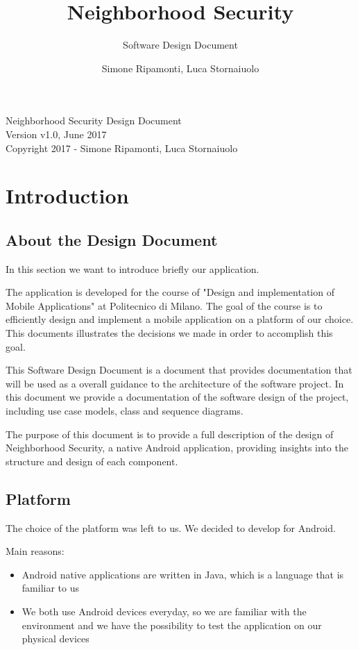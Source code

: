 \documentclass[a4paper]{scrreprt}
\title{ Neighborhood Security}
\subtitle{Software Design Document}
\author{Simone Ripamonti, Luca Stornaiuolo}
\begin{document}
\maketitle

\null\vfill
\noindent
Neighborhood Security Design Document \\
Version v1.0, June 2017\\
Copyright 2017 - Simone Ripamonti, Luca Stornaiuolo\\
\newpage


\tableofcontents


\chapter{Introduction}

\section{About the Design Document}
In this section we want to introduce briefly our application.
\par The application is developed for the course of "Design and implementation of Mobile Applications" at Politecnico di Milano. The goal of the course is to efficiently design and implement a mobile application on a platform of our choice. This documents illustrates the decisions we made in order to accomplish this goal.
\par This Software Design Document is a document that provides documentation that will be used as a overall guidance to the architecture of the software project. In this document we provide a documentation of the software design of the project, including use case models, class and sequence diagrams.
\par The purpose of this document is to provide a full description of the design of Neighborhood Security, a native Android application, providing insights into the structure and design of each component.

\section{Platform}
The choice of the platform was left to us. We decided to develop for Android.
\par Main reasons:
\begin{itemize}
\item Android native applications are written in Java, which is a language that is familiar to us
\item We both use Android devices everyday, so we are familiar with the environment and we have the possibility to test the application on our physical devices
\end{itemize}
\end{document}
